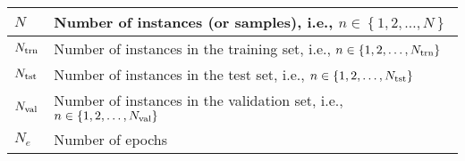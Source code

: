 \begin{xltabular}{\textwidth}{XX}
	\(N\)                                                                                                                                                                          & Number of instances (or samples), i.e., \(n \in \left\{ 1, 2, \dots, N \right\}\)                                                                                                                                                                                                                                                      \\ \hline
	\(N_{\textnormal{trn}}\)                                                                                                                                                       & Number of instances in the training set, i.e., \(n \in \left\{ 1, 2, \dots, N_\textnormal{trn} \right\}\)                                                                                                                                                                                                                              \\ \hline
	\(N_{\textnormal{tst}}\)                                                                                                                                                       & Number of instances in the test set, i.e., \(n \in \left\{ 1, 2, \dots, N_\textnormal{tst} \right\}\)                                                                                                                                                                                                                                  \\ \hline
	\(N_{\textnormal{val}}\)                                                                                                                                                       & Number of instances in the validation set, i.e., \(n \in \left\{ 1, 2, \dots, N_\textnormal{val} \right\}\)                                                                                                                                                                                                                            \\ \hline
	\(N_e\)                                                                                                                                                                        & Number of epochs                                                                                                                                                                                                                                                                                                                       \\ \hline

\end{xltabular}
